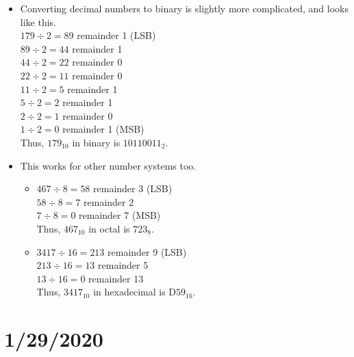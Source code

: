 \documentclass[10pt,a4paper]{article}
\begin{document}
\begin{itemize}
\begin{itemize}
\end{itemize}
\item Converting decimal numbers to binary is slightly more complicated, and looks like this.\\
$179\div2=89$ remainder 1 (LSB)\\
$89\div2=44$ remainder 1\\
$44\div2=22$ remainder 0\\
$22\div2=11$ remainder 0\\
$11\div2=5$ remainder 1\\
$5\div2=2$ remainder 1\\
$2\div2=1$ remainder 0\\
$1\div2=0$ remainder 1 (MSB)\\
Thus, $179_{10}$ in binary is $10110011_{2}$.
\item This works for other number systems too.
\begin{itemize}
\item $467\div8=58$ remainder 3 (LSB)\\
$58\div8=7$ remainder 2\\
$7\div8=0$ remainder 7 (MSB)\\
Thus, $467_{10}$ in octal is $723_{8}$. 
\item $3417\div16=213$ remainder 9 (LSB)\\
$213\div16=13$ remainder 5\\
$13\div16=0$ remainder 13\\
Thus, $3417_{10}$ in hexadecimal is D$59_{16}$. 
\end{itemize}
\end{itemize}
\section{1/29/2020}
\end{document}
